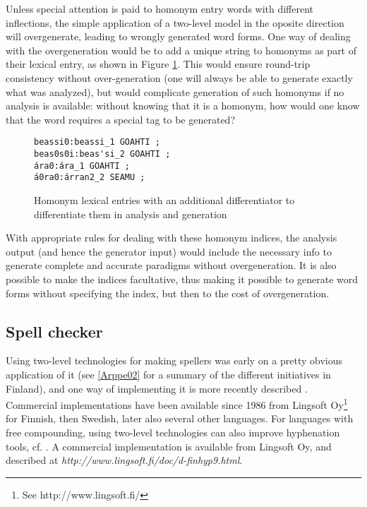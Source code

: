\documentclass[a4paper,english]{article}
\begin{document}
Unless special attention is paid to homonym entry words with different inflections, the simple application of a two-level model in the oposite direction will overgenerate, leading to wrongly generated word forms. One way of dealing with the overgeneration would be to add a unique string to homonyms as part of their lexical entry, as shown in Figure \ref{homonlex}. This would ensure round-trip consistency without over-generation (one will always be able to generate exactly what was analyzed), but would complicate generation of such homonyms if no analysis is available: without knowing that it is a homonym, how would one know that the word requires a special tag to be generated?

\begin{figure}[htb]
\begin{center}
\begin{verbatim}
beassi0:beassi_1 GOAHTI ;
beas0s0i:beas'si_2 GOAHTI ;
ára0:ára_1 GOAHTI ;
á0ra0:árran2_2 SEAMU ;
\end{verbatim}
\end{center}
\caption{Homonym lexical entries with an additional differentiator to differentiate them in analysis and generation}
\label{homonlex}
\end{figure}

With appropriate rules for dealing with these homonym indices, the analysis output (and hence the generator input) would include the necessary info to generate complete and accurate paradigms without overgeneration. It is also possible to make the indices facultative, thus making it possible to generate word forms without specifying the index, but then to the cost of overgeneration.


\subsection{Spell checker}\label{spell}

Using two-level technologies for making spellers was early on a pretty obvious application of it (see \ref{Arppe02} for a summary of the different initiatives in Finland), and one way of implementing it is more recently described \cite{Beesley03}. Commercial implementations have been available since 1986 from Lingsoft Oy\footnote{See http://www.lingsoft.fi/} for Finnish, then Swedish, later also several other languages. For languages with free compounding, using two-level technologies can also improve hyphenation tools, cf. \cite{Karlsson85}. A commercial implementation is available from Lingsoft Oy, and described at \textit{http://www.lingsoft.fi/doc/d-finhyp9.html}.
\end{document}
